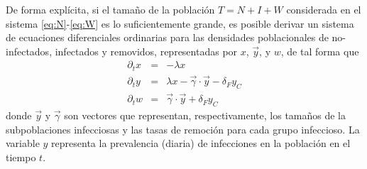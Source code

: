\documentclass[8pt]{article}
\newcommand{\vertex}{\node[vertex]}
\begin{document}
\bigskip
\begin{minipage}{0.6\textwidth}
De forma explícita, si el tamaño de la población $T=N+I+W$ considerada en el sistema \eqref{eq:N}-\eqref{eq:W} es lo suficientemente grande, es posible derivar un sistema de ecuaciones diferenciales ordinarias para las densidades poblacionales de no-infectados, infectados y removidos, representadas por $x$, $\vec{y}$, y $w$, de tal forma que
\begin{eqnarray*}
\partial_{t} x &=& -  \lambda x\\
\partial_{t} y &=& \lambda x - \vec{\gamma} \cdot \vec{y}  - \delta_{F} y_{C}
\\
\partial_{t} w &=&\vec{\gamma} \cdot \vec{y} + \delta_{F} y_{C}
\end{eqnarray*}
donde $\vec{y}$ y  $\vec{\gamma}$  son  vectores que representan, respectivamente,  los tamaños de la subpoblaciones infecciosas y las tasas de remoción para cada grupo infeccioso. La variable $y$ representa la prevalencia (diaria) de infecciones en la población en el tiempo $t$.
\end{minipage}%
\begin{minipage}{0.4\textwidth}
\centering
{}
\end{minipage}%






\end{document}
